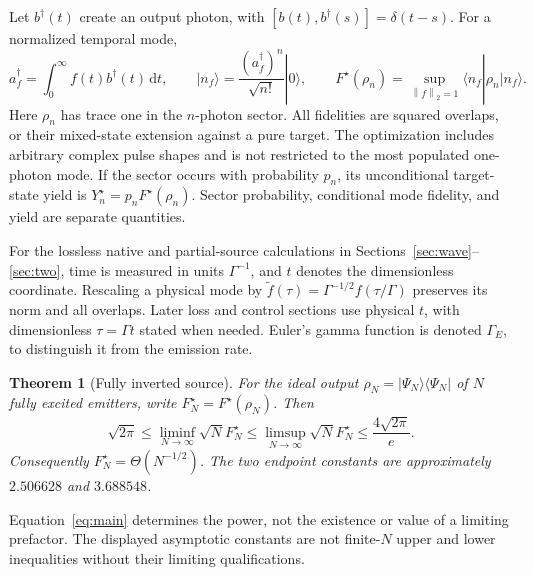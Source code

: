 \documentclass[11pt,a4paper]{article}
\newtheorem{theorem}{Theorem}
\newcommand{\GE}{\Gamma_{\!E}}
\newcommand{\norm}[1]{\left\lVert#1\right\rVert}
\newcommand{\Fock}[2]{\lvert #1_{#2}\rangle}
\newcommand{\dd}{\,\mathrm d}
\begin{document}
Let \(b^\dagger(t)\) create an output photon, with
\([b(t),b^\dagger(s)]=\delta(t-s)\). For a normalized temporal mode,
\begin{equation}
 a_f^\dagger=\int_0^\infty f(t)b^\dagger(t)\dd t,\qquad
 \Fock{n}{f}=\frac{(a_f^\dagger)^n}{\sqrt{n!}}|0\rangle,\qquad
 F^\star(\rho_n)=\sup_{\norm{f}_2=1}\langle n_f|\rho_n|n_f\rangle.
 \label{eq:fidelitydef}
\end{equation}
Here \(\rho_n\) has trace one in the \(n\)-photon sector. All
fidelities are squared overlaps, or their mixed-state extension
against a pure target. The optimization includes arbitrary complex
pulse shapes and is not restricted to the most populated one-photon
mode. If the sector occurs with probability \(p_n\), its unconditional
target-state yield is \(Y_n^\star=p_nF^\star(\rho_n)\). Sector
probability, conditional mode fidelity, and yield are separate
quantities.

For the lossless native and partial-source calculations in
Sections~\ref{sec:wave}--\ref{sec:two}, time is measured in units
\(\Gamma^{-1}\), and \(t\) denotes the dimensionless coordinate.
Rescaling a physical mode by
\(\widetilde f(\tau)=\Gamma^{-1/2}f(\tau/\Gamma)\) preserves its norm
and all overlaps. Later loss and control sections use physical
\(t\), with dimensionless \(\tau=\Gamma t\) stated when needed.
Euler's gamma function is denoted \(\GE\), to distinguish it from
the emission rate.

\begin{theorem}[Fully inverted source]
For the ideal output \(\rho_N=|\Psi_N\rangle\langle\Psi_N|\) of \(N\) fully excited emitters, write \(F_N^\star=F^\star(\rho_N)\). Then
\begin{equation}\boxed{
 \sqrt{2\pi}\le\liminf_{N\to\infty}\sqrt N F_N^\star
 \le\limsup_{N\to\infty}\sqrt N F_N^\star
 \le\frac{4\sqrt{2\pi}}{e}.}
\label{eq:main}
\end{equation}
Consequently $F_N^\star=\Theta(N^{-1/2})$. The two endpoint constants are approximately $2.506628$ and $3.688548$.
\end{theorem}
Equation~\eqref{eq:main} determines the power, not the existence or value of a limiting prefactor. The displayed asymptotic constants are not finite-$N$ upper and lower inequalities without their limiting qualifications.
\end{document}
